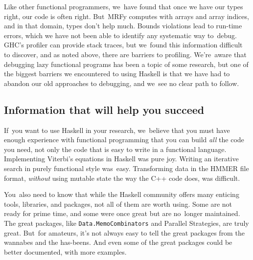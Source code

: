 \documentclass[preprint,nonatbib,blockstyle,nocopyrightspace,times]{sigplanconf}
\newcommand\seclabel[1]{\label{sec:#1}}
\newcommand\finalremark{\remark}
\newcommand\finalremark[1]{\relax}
\begin{document}
Like other functional programmers, we~have found that 
once we have our types right, our code is often right.
But~MRFy computes with arrays and array indices,
and in that domain, types don't help much.
Bounds violations lead to run-time errors, which we have not been able
to identify any systematic way to~debug.
GHC's profiler can provide stack traces, but we~found this information
difficult to discover, and as noted above,
there are barriers to profiling.
We're~aware that debugging lazy functional programs has been a topic
of some research,\finalremark{Do we cite Hood, Hat, or Freya?}
but one of the biggest barriers we encountered to using Haskell is
that we have had to abandon our old approaches to debugging,
and we~see no clear path to follow.


\subsection{Information that will help you succeed}

If~you want to use Haskell in your research, we~believe that you must
have enough experience with functional programming that you can build
\emph{all} the code you need, not only the code that is easy to write
in a functional language.
Implementing Viterbi's equations in Haskell was pure joy.
Writing an iterative search in purely functional style was~easy.
Transforming data in the HMMER file format, \emph{without}
using mutable state the way the C++ code does, was difficult.

\seclabel{penumbra}

You~also need to know that while the Haskell community offers many
enticing tools, libraries, and packages,
not all of them are worth using.
Some are not ready for prime time, and some were once great but are
no~longer maintained.
The great packages, like \texttt{Data.MemoCombinators} and Parallel
Strategies, are truly great.
But~for amateurs, it's not always easy to tell the great packages from the wannabes
and the has-beens.
And even some of the great packages could be better documented, with
more examples.

\end{document}
